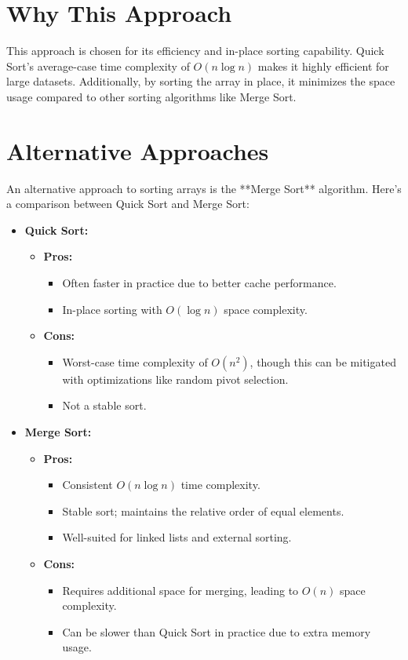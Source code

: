 \section*{Why This Approach}
This approach is chosen for its efficiency and in-place sorting capability. Quick Sort's average-case time complexity of \(O(n \log n)\) makes it highly efficient for large datasets. Additionally, by sorting the array in place, it minimizes the space usage compared to other sorting algorithms like Merge Sort.

\section*{Alternative Approaches}
An alternative approach to sorting arrays is the **Merge Sort** algorithm. Here's a comparison between Quick Sort and Merge Sort:

\begin{itemize}
    \item \textbf{Quick Sort:}
    \begin{itemize}
        \item \textbf{Pros:} 
        \begin{itemize}
            \item Often faster in practice due to better cache performance.
            \item In-place sorting with \(O(\log n)\) space complexity.
        \end{itemize}
        \item \textbf{Cons:} 
        \begin{itemize}
            \item Worst-case time complexity of \(O(n^2)\), though this can be mitigated with optimizations like random pivot selection.
            \item Not a stable sort.
        \end{itemize}
    \end{itemize}
    
    \item \textbf{Merge Sort:}
    \begin{itemize}
        \item \textbf{Pros:} 
        \begin{itemize}
            \item Consistent \(O(n \log n)\) time complexity.
            \item Stable sort; maintains the relative order of equal elements.
            \item Well-suited for linked lists and external sorting.
        \end{itemize}
        \item \textbf{Cons:} 
        \begin{itemize}
            \item Requires additional space for merging, leading to \(O(n)\) space complexity.
            \item Can be slower than Quick Sort in practice due to extra memory usage.
        \end{itemize}
    \end{itemize}
\end{itemize}


